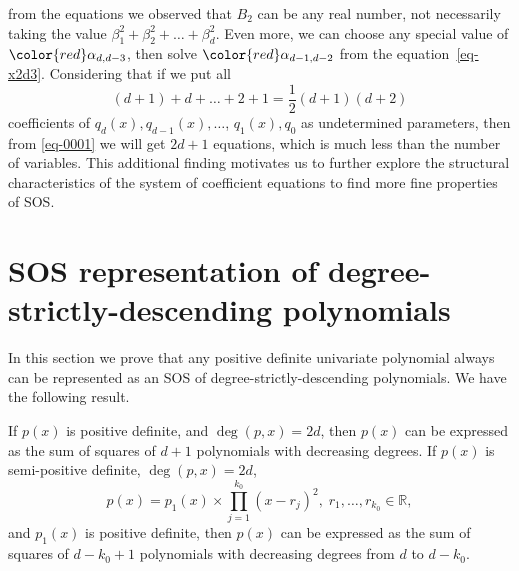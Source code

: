 \documentclass[runningheads]{llncs}
\begin{document}
from the equations we observed that $B_2$ can be any real number, not necessarily taking the value $\beta_1^2+\beta_2^2+\ldots+\beta_d^2$. Even more, we can choose any special value of ${\color{red}\alpha_{d,d-3}}$, then solve ${\color{red}\alpha_{d-1,d-2}}$ from the equation~\eqref{eq-x2d3}.  
Considering that if we put all 
$$
(d+1)+d+\ldots+2+1=\frac{1}{2}(d+1)(d+2)
$$
coefficients of $q_d(x),q_{d-1}(x),\ldots$, $q_1(x), q_0$ as undetermined parameters, then from \eqref{eq-0001} we will get $2d+1$ equations, which is much less than the number of variables.    
This additional finding motivates us to further explore the structural characteristics of the system of coefficient equations to find more fine properties of SOS. 

\section{SOS representation of degree-strictly-descending polynomials}
\label{ddp-sos}

In this section we prove that
any positive definite univariate polynomial always can be represented as an SOS of degree-strictly-descending polynomials. We have the following result. 

\begin{theorem}
If $p(x)$ is positive definite, and $\deg(p,x)=2d$, then  $p(x)$ can be expressed as the sum of squares of $d+1$ polynomials with decreasing degrees.  
If $p(x)$ is semi-positive definite, 
$\deg(p,x)=2d$,  
$$
p(x)=p_1(x)\times 
\prod_{j=1}^{k_0}(x-r_j)^{2}, \;
r_1,\ldots,r_{k_0}\in \mathbb{R},
$$
and $p_1(x)$ is positive definite, 
then $p(x)$ can be expressed as the sum of squares of $d-k_0+1$ polynomials with decreasing degrees from $d$ to $d-k_0$.   
\label{thm-2}
\end{theorem}
\end{document}
